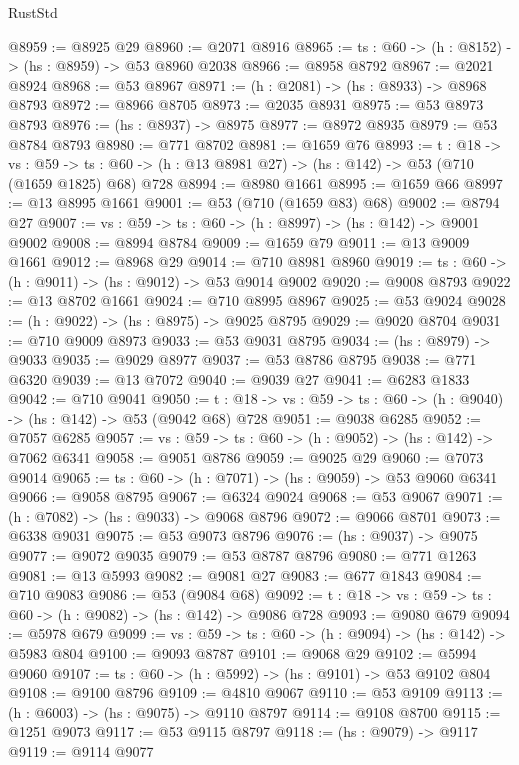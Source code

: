 \begin{lexlean}{RustStd}
\begin{coremodule}
@8959 := @8925 @29
@8960 := @2071 @8916
@8965 := {ts : @60} -> (h : @8152) -> (hs : @8959) -> @53 @8960 @2038
@8966 := @8958 @8792
@8967 := @2021 @8924
@8968 := @53 @8967
@8971 := (h : @2081) -> (hs : @8933) -> @8968 @8793
@8972 := @8966 @8705
@8973 := @2035 @8931
@8975 := @53 @8973 @8793
@8976 := (hs : @8937) -> @8975
@8977 := @8972 @8935
@8979 := @53 @8784 @8793
@8980 := @771 @8702
@8981 := @1659 @76
@8993 := {t : @18} ->
  {vs : @59} ->
  {ts : @60} -> (h : @13 @8981 @27) -> (hs : @142) -> @53 (@710 (@1659 @1825) @68) @728
@8994 := @8980 @1661
@8995 := @1659 @66
@8997 := @13 @8995 @1661
@9001 := @53 (@710 (@1659 @83) @68)
@9002 := @8794 @27
@9007 := {vs : @59} -> {ts : @60} -> (h : @8997) -> (hs : @142) -> @9001 @9002
@9008 := @8994 @8784
@9009 := @1659 @79
@9011 := @13 @9009 @1661
@9012 := @8968 @29
@9014 := @710 @8981 @8960
@9019 := {ts : @60} -> (h : @9011) -> (hs : @9012) -> @53 @9014 @9002
@9020 := @9008 @8793
@9022 := @13 @8702 @1661
@9024 := @710 @8995 @8967
@9025 := @53 @9024
@9028 := (h : @9022) -> (hs : @8975) -> @9025 @8795
@9029 := @9020 @8704
@9031 := @710 @9009 @8973
@9033 := @53 @9031 @8795
@9034 := (hs : @8979) -> @9033
@9035 := @9029 @8977
@9037 := @53 @8786 @8795
@9038 := @771 @6320
@9039 := @13 @7072
@9040 := @9039 @27
@9041 := @6283 @1833
@9042 := @710 @9041
@9050 := {t : @18} -> {vs : @59} -> {ts : @60} -> (h : @9040) -> (hs : @142) -> @53 (@9042 @68) @728
@9051 := @9038 @6285
@9052 := @7057 @6285
@9057 := {vs : @59} -> {ts : @60} -> (h : @9052) -> (hs : @142) -> @7062 @6341
@9058 := @9051 @8786
@9059 := @9025 @29
@9060 := @7073 @9014
@9065 := {ts : @60} -> (h : @7071) -> (hs : @9059) -> @53 @9060 @6341
@9066 := @9058 @8795
@9067 := @6324 @9024
@9068 := @53 @9067
@9071 := (h : @7082) -> (hs : @9033) -> @9068 @8796
@9072 := @9066 @8701
@9073 := @6338 @9031
@9075 := @53 @9073 @8796
@9076 := (hs : @9037) -> @9075
@9077 := @9072 @9035
@9079 := @53 @8787 @8796
@9080 := @771 @1263
@9081 := @13 @5993
@9082 := @9081 @27
@9083 := @677 @1843
@9084 := @710 @9083
@9086 := @53 (@9084 @68)
@9092 := {t : @18} -> {vs : @59} -> {ts : @60} -> (h : @9082) -> (hs : @142) -> @9086 @728
@9093 := @9080 @679
@9094 := @5978 @679
@9099 := {vs : @59} -> {ts : @60} -> (h : @9094) -> (hs : @142) -> @5983 @804
@9100 := @9093 @8787
@9101 := @9068 @29
@9102 := @5994 @9060
@9107 := {ts : @60} -> (h : @5992) -> (hs : @9101) -> @53 @9102 @804
@9108 := @9100 @8796
@9109 := @4810 @9067
@9110 := @53 @9109
@9113 := (h : @6003) -> (hs : @9075) -> @9110 @8797
@9114 := @9108 @8700
@9115 := @1251 @9073
@9117 := @53 @9115 @8797
@9118 := (hs : @9079) -> @9117
@9119 := @9114 @9077

\end{coremodule}
\end{lexlean}
